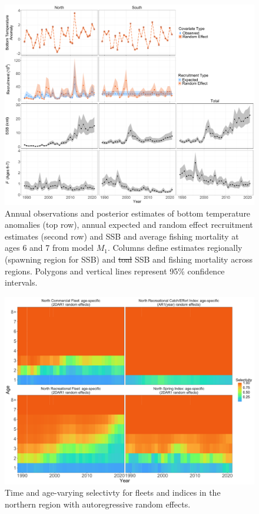 \documentclass[
]{article}
\makeatletter
\providecommand{\DIFaddtex}[1]{{\protect\color{blue}\uwave{#1}}} %
\providecommand{\DIFdeltex}[1]{{\protect\color{red}\sout{#1}}} %
\providecommand{\DIFaddFL}[1]{\DIFadd{#1}} %
\providecommand{\DIFdelFL}[1]{\DIFdel{#1}} %
\providecommand{\DIFaddbeginFL}{} %
\providecommand{\DIFaddendFL}{} %
\providecommand{\DIFdelbeginFL}{} %
\providecommand{\DIFdelendFL}{} %
\providecommand{\DIFadd}[1]{\texorpdfstring{\DIFaddtex{#1}}{#1}} %
\providecommand{\DIFdel}[1]{\texorpdfstring{\DIFdeltex{#1}}{}} %
\newcommand{\DIFscaledelfig}{0.5}
\newlength{\DIFdelgraphicswidth} %
\newlength{\DIFdelgraphicsheight} %
\newcommand{\DIFaddincludegraphics}[2][]{{\color{blue}\fbox{\DIFOincludegraphics[#1]{#2}}}} %
\newcommand{\DIFdelincludegraphics}[2][]{%
\sbox{\DIFdelgraphicsbox}{\DIFOincludegraphics[#1]{#2}}%
\settoboxwidth{\DIFdelgraphicswidth}{\DIFdelgraphicsbox} %
\settoboxtotalheight{\DIFdelgraphicsheight}{\DIFdelgraphicsbox} %
\scalebox{\DIFscaledelfig}{%
\parbox[b]{\DIFdelgraphicswidth}{\usebox{\DIFdelgraphicsbox}\\[-\baselineskip] \rule{\DIFdelgraphicswidth}{0em}}\llap{\resizebox{\DIFdelgraphicswidth}{\DIFdelgraphicsheight}{%
\setlength{\unitlength}{\DIFdelgraphicswidth}%
\begin{picture}(1,1)%
\thicklines\linethickness{2pt} %
{\color[rgb]{1,0,0}\put(0,0){\framebox(1,1){}}}%
{\color[rgb]{1,0,0}\put(0,0){\line( 1,1){1}}}%
{\color[rgb]{1,0,0}\put(0,1){\line(1,-1){1}}}%
\end{picture}%
}\hspace*{3pt}}} %
} %
\DeclareRobustCommand{\DIFaddbeginFL}{\DIFOaddbeginFL \let\includegraphics\DIFaddincludegraphics} %
\DeclareRobustCommand{\DIFaddendFL}{\DIFOaddendFL \let\includegraphics\DIFOincludegraphics} %
\DeclareRobustCommand{\DIFdelbeginFL}{\DIFOdelbeginFL \let\includegraphics\DIFdelincludegraphics} %
\DeclareRobustCommand{\DIFdelendFL}{\DIFOaddendFL \let\includegraphics\DIFOincludegraphics} %
\let\sout@orig\sout %
\renewcommand{\sout}[1]{\ifmmode\text{\sout@orig{\ensuremath{#1}}}\else\sout@orig{#1}\fi} %
\makeatother
\begin{document}
\begin{figure}

{\centering \includegraphics[height=0.95\textheight]{E_R_SSB_F_fig} 

}

\caption{Annual observations and posterior estimates of bottom temperature anomalies (top row), annual expected and random effect recruitment estimates (second row) and SSB and average fishing mortality at ages 6 and 7 from model $M_1$. Columns define estimates regionally (spawning region for SSB) and \DIFdelbeginFL \DIFdelFL{toal }\DIFdelendFL \DIFaddbeginFL \DIFaddFL{total }\DIFaddendFL SSB and fishing mortality across regions. Polygons and vertical lines represent 95\% confidence intervals.}\label{fig:E-R-SSB-F}
\end{figure}
\pagebreak

\begin{figure}

{\centering \includegraphics[height=0.95\textheight]{selectivity_re_plot} 

}

\caption{Time and age-varying selectivty for fleets and indices in the northern region with autoregressive random effects.}\label{fig:selectivity-re}
\end{figure}
\pagebreak
\end{document}
